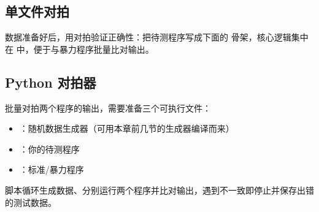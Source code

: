 

\subsection{单文件对拍}

数据准备好后，用对拍验证正确性：把待测程序写成下面的  骨架，核心逻辑集中在  中，便于与暴力程序批量比对输出。



\subsection{Python 对拍器}

批量对拍两个程序的输出，需要准备三个可执行文件：
\begin{itemize}
    \item {}：随机数据生成器（可用本章前几节的生成器编译而来）
    \item {}：你的待测程序
    \item {}：标准/暴力程序
\end{itemize}

脚本循环生成数据、分别运行两个程序并比对输出，遇到不一致即停止并保存出错的测试数据。


